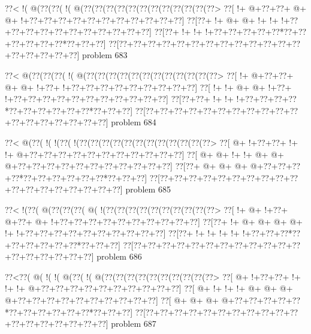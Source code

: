 \vbox{\vbox{\goo
\0??<\- !(\- @(\0??(\0??(\- !(\- @(\0??(\0??(\0??(\0??(\0??(\0??(\0??(\0??(\0??(\0??(\0??(\0??>
\0??[\- !+\- @+\0??+\0??+\- @+\- @+\- !+\0??+\0??+\0??+\0??+\0??+\0??+\0??+\0??+\0??+\0??+\0??]
\0??[\0??+\- !+\- @+\- @+\- !+\- !+\- !+\0??+\0??+\0??+\0??+\0??+\0??+\0??+\0??+\0??+\0??+\0??]
\0??[\0??+\- !+\- !+\- !+\0??+\0??+\0??+\0??+\0??*\0??+\0??+\0??+\0??+\0??+\0??*\0??+\0??+\0??]
\0??[\0??+\0??+\0??+\0??+\0??+\0??+\0??+\0??+\0??+\0??+\0??+\0??+\0??+\0??+\0??+\0??+\0??+\0??]
}
\hfil problem 683\hfil\break
}



\vbox{\vbox{\goo
\0??<\- @(\0??(\0??(\0??(\- !(\- @(\0??(\0??(\0??(\0??(\0??(\0??(\0??(\0??(\0??(\0??(\0??(\0??>
\0??[\- !+\- @+\0??+\0??+\- @+\- @+\- !+\0??+\- !+\0??+\0??+\0??+\0??+\0??+\0??+\0??+\0??+\0??]
\0??[\- !+\- !+\- @+\- @+\- !+\0??+\- !+\0??+\0??+\0??+\0??+\0??+\0??+\0??+\0??+\0??+\0??+\0??]
\0??[\0??+\0??+\- !+\- !+\- !+\0??+\0??+\0??+\0??*\0??+\0??+\0??+\0??+\0??+\0??*\0??+\0??+\0??]
\0??[\0??+\0??+\0??+\0??+\0??+\0??+\0??+\0??+\0??+\0??+\0??+\0??+\0??+\0??+\0??+\0??+\0??+\0??]
}
\hfil problem 684\hfil\break
}



\vbox{\vbox{\goo
\0??<\- @(\0??(\- !(\- !(\0??(\- !(\0??(\0??(\0??(\0??(\0??(\0??(\0??(\0??(\0??(\0??(\0??(\0??>
\0??[\- @+\- !+\0??+\0??+\- !+\- !+\- @+\0??+\0??+\0??+\0??+\0??+\0??+\0??+\0??+\0??+\0??+\0??]
\0??[\- @+\- @+\- !+\- !+\- @+\- @+\- @+\0??+\0??+\0??+\0??+\0??+\0??+\0??+\0??+\0??+\0??+\0??]
\0??[\0??+\- @+\- @+\- @+\- @+\0??+\0??+\0??+\0??*\0??+\0??+\0??+\0??+\0??+\0??*\0??+\0??+\0??]
\0??[\0??+\0??+\0??+\0??+\0??+\0??+\0??+\0??+\0??+\0??+\0??+\0??+\0??+\0??+\0??+\0??+\0??+\0??]
}
\hfil problem 685\hfil\break
}



\vbox{\vbox{\goo
\0??<\- !(\0??(\- @(\0??(\0??(\0??(\- @(\- !(\0??(\0??(\0??(\0??(\0??(\0??(\0??(\0??(\0??(\0??>
\0??[\- !+\- @+\- !+\0??+\- @+\0??+\- @+\- !+\0??+\0??+\0??+\0??+\0??+\0??+\0??+\0??+\0??+\0??]
\0??[\0??+\- !+\- @+\- @+\- @+\- @+\- !+\- !+\0??+\0??+\0??+\0??+\0??+\0??+\0??+\0??+\0??+\0??]
\0??[\0??+\- !+\- !+\- !+\- !+\- !+\0??+\0??+\0??*\0??+\0??+\0??+\0??+\0??+\0??*\0??+\0??+\0??]
\0??[\0??+\0??+\0??+\0??+\0??+\0??+\0??+\0??+\0??+\0??+\0??+\0??+\0??+\0??+\0??+\0??+\0??+\0??]
}
\hfil problem 686\hfil\break
}



\vbox{\vbox{\goo
\0??<\0??(\- @(\- !(\- !(\- @(\0??(\- !(\- @(\0??(\0??(\0??(\0??(\0??(\0??(\0??(\0??(\0??(\0??>
\0??[\- @+\- !+\0??+\0??+\- !+\- !+\- !+\- @+\0??+\0??+\0??+\0??+\0??+\0??+\0??+\0??+\0??+\0??]
\0??[\- @+\- !+\- !+\- !+\- @+\- @+\- @+\- @+\0??+\0??+\0??+\0??+\0??+\0??+\0??+\0??+\0??+\0??]
\0??[\- @+\- @+\- @+\- @+\0??+\0??+\0??+\0??+\0??*\0??+\0??+\0??+\0??+\0??+\0??*\0??+\0??+\0??]
\0??[\0??+\0??+\0??+\0??+\0??+\0??+\0??+\0??+\0??+\0??+\0??+\0??+\0??+\0??+\0??+\0??+\0??+\0??]
}
\hfil problem 687\hfil\break
}



